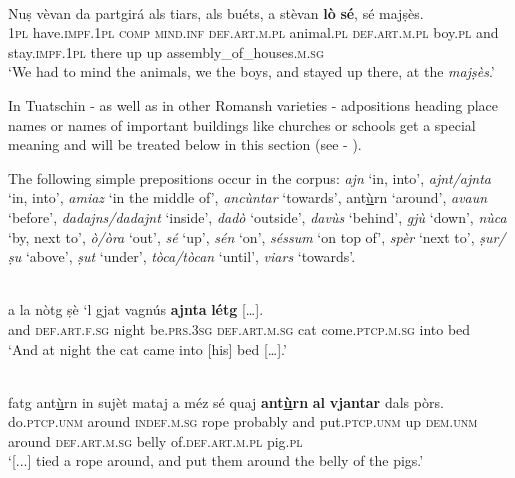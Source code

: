 \ea
\label{}
\\
\gll Nuṣ vèvan da partgirá als tiars, als buéts, a stèvan \textbf{lò} \textbf{sé}, sé majṣès.\\
\textsc{1pl} have.\textsc{impf.1pl} \textsc{comp} \textsc{mind.inf} \textsc{def.art.m.pl} animal.\textsc{pl} \textsc{def.art.m.pl} boy.\textsc{pl} and stay.\textsc{impf.1pl} there up up assembly\_of\_houses.\textsc{m.sg}\\
\glt `We had to mind the animals, we the boys, and stayed up there, at the \textit{majṣès}.'
\z

In Tuatschin - as well as in other Romansh varieties - adpositions heading place names or names of important buildings like churches or schools get a special meaning and will be treated below in this section (see  - ).

The following simple prepositions occur in the corpus: \textit{ajn} `in, into', \textit{ajnt/ajnta} `in, into', \textit{amiaz} `in the middle of', \textit{ancùntar} `towards', ant\underline{ù}rn `around', \textit{avaun} `before', \textit{dadajns/dadajnt} `inside', \textit{dadò} `outside', \textit{\textit{davùs}} `behind', \textit{gjù} `down', \textit{nùca} `by, next to', \textit{ò/òra} `out', \textit{sé} `up', \textit{sén} `on', \textit{séssum} `on top of', \textit{spèr} `next to', \textit{ṣur/ṣu} `above', \textit{ṣut} `under', \textit{tòca/tòcan} `until', \textit{viars} `towards'.

\ea
\label{}
\\
\gll a la nòtg ṣè ‘l gjat vagnús \textbf{ajnta} \textbf{létg} […].\\
and \textsc{def.art.f.sg} night be.\textsc{prs.3sg} \textsc{def.art.m.sg} cat come.\textsc{ptcp.m.sg} into bed\\
\glt `And at night the cat came into [his] bed […].'
\z

\ea
\label{}
\\
\gll    [...] fatg ant\underline{ù}rn in sujèt mataj a méz sé quaj \textbf{ant\underline{ù}rn} \textbf{al} \textbf{vjantar} dals pòrs.\\
{} do.\textsc{ptcp.unm} around \textsc{indef.m.sg} rope probably and put.\textsc{ptcp.unm} up  \textsc{dem.unm} around \textsc{def.art.m.sg} belly of.\textsc{def.art.m.pl} pig.\textsc{pl} \\
\glt `[...] tied a rope around, and put them around the belly of the pigs.'
\z


